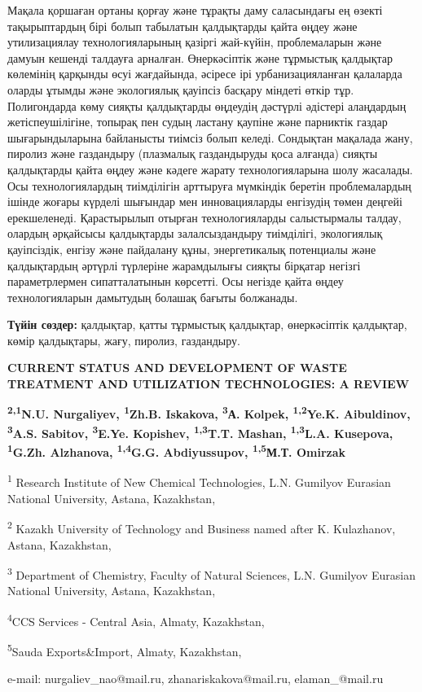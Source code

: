Мақала қоршаған ортаны қорғау және тұрақты даму саласындағы ең өзекті
тақырыптардың бірі болып табылатын қалдықтарды қайта өңдеу және
утилизациялау технологияларының қазіргі жай-күйін, проблемаларын және
дамуын кешенді талдауға арналған. Өнеркәсіптік және тұрмыстық қалдықтар
көлемінің қарқынды өсуі жағдайында, әсіресе ірі урбанизацияланған
қалаларда оларды ұтымды және экологиялық қауіпсіз басқару міндеті өткір
тұр. Полигондарда көму сияқты қалдықтарды өңдеудің дәстүрлі әдістері
алаңдардың жетіспеушілігіне, топырақ пен судың ластану қаупіне және
парниктік газдар шығарындыларына байланысты тиімсіз болып келеді.
Сондықтан мақалада жану, пиролиз және газдандыру (плазмалық газдандыруды
қоса алғанда) сияқты қалдықтарды қайта өңдеу және кәдеге жарату
технологияларына шолу жасалады. Осы технологиялардың тиімділігін
арттыруға мүмкіндік беретін проблемалардың ішінде жоғары күрделі
шығындар мен инновацияларды енгізудің төмен деңгейі ерекшеленеді.
Қарастырылып отырған технологияларды салыстырмалы талдау, олардың
әрқайсысы қалдықтарды залалсыздандыру тиімділігі, экологиялық
қауіпсіздік, енгізу және пайдалану құны, энергетикалық потенциалы және
қалдықтардың әртүрлі түрлеріне жарамдылығы сияқты бірқатар негізгі
параметрлермен сипатталатынын көрсетті. Осы негізде қайта өңдеу
технологияларын дамытудың болашақ бағыты болжанады.

{\bfseries Түйін сөздер:} қалдықтар, қатты тұрмыстық қалдықтар,
өнеркәсіптік қалдықтар, көмір қалдықтары, жағу, пиролиз, газдандыру.

\begin{articleheader}
{\bfseries CURRENT STATUS AND DEVELOPMENT OF WASTE TREATMENT AND UTILIZATION TECHNOLOGIES: A REVIEW}

{\bfseries
\textsuperscript{2,1}N.U. Nurgaliyev\textsuperscript{\envelope },
\textsuperscript{1}Zh.B. Iskakova\textsuperscript{\envelope },
\textsuperscript{3}А. Kolpek,
\textsuperscript{1,2}Ye.K. Aibuldinov\textsuperscript{\envelope },
\textsuperscript{3}A.S. Sabitov,
\textsuperscript{3}E.Ye. Kopishev,
\textsuperscript{1,3}T.T. Mashan,
\textsuperscript{1,3}L.A. Kusepova,
\textsuperscript{1}G.Zh. Alzhanova,
\textsuperscript{1,4}G.G. Abdiyussupov,
\textsuperscript{1,5}М.Т. Omirzak
}
\end{articleheader}

\begin{articleheader}
\textsuperscript{1} Research Institute of New Chemical Technologies, L.N. Gumilyov Eurasian National University, Astana, Kazakhstan,

\textsuperscript{2} Kazakh University of Technology and Business named after K. Kulazhanov, Astana, Kazakhstan,

\textsuperscript{3} Department of Chemistry, Faculty of Natural Sciences, L.N. Gumilyov Eurasian National University, Astana, Kazakhstan,

\textsuperscript{4}CCS Services - Central Asia, Almaty, Kazakhstan,

\textsuperscript{5}Sauda Exports\&Import, Almaty, Kazakhstan,

e-mail: nurgaliev\_nao@mail.ru, zhanariskakova@mail.ru, elaman\_@mail.ru
\end{articleheader}

